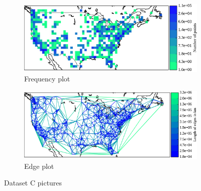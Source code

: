 %

\begin{figure}[p]
	\begin{subfigure}[b]{\textwidth}
	\centering
	\includegraphics[width=1.\textwidth]{pix/freq_usa_small.pdf}
		\caption{Frequency plot}
	\end{subfigure}
	\begin{subfigure}[b]{\textwidth}
	\centering
	\includegraphics[width=1.\textwidth]{pix/tri_usa_small.pdf}
		\caption{Edge plot}
	\end{subfigure}
	\caption[Dataset C frequency and edge plots]{Dataset C pictures}
	\label{fig:C}
\end{figure}





